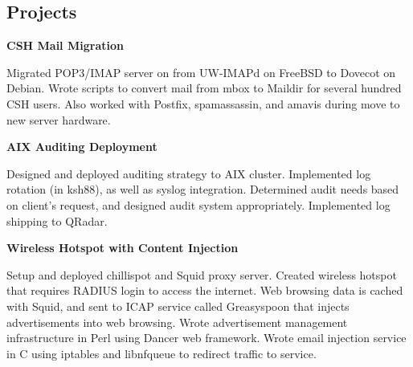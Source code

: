 \documentclass[letter,margin,line]{resume}
\begin{document}
\begin{resume}
\section{\mysidestyle Projects}
	\begin{asparablank}
		\item {\bf CSH Mail Migration}
		
		\small Migrated POP3/IMAP server on from UW-IMAPd on FreeBSD to Dovecot on Debian. Wrote scripts to convert mail from mbox to Maildir for several hundred CSH users. Also worked with Postfix, spamassassin, and amavis during move to new server hardware.
		\normalsize
		\\
		
		\item {\bf AIX Auditing Deployment}
		
		\small Designed and deployed auditing strategy to AIX cluster.
		Implemented log rotation (in ksh88), as well as syslog
		integration. Determined audit needs based on client's request,
		and designed audit system appropriately. Implemented log
		shipping to QRadar.
		\normalsize
		\\
		
		\item {\bf Wireless Hotspot with Content Injection}
		
		\small Setup and deployed chillispot and Squid proxy server.
        Created wireless hotspot that requires RADIUS login to access the
        internet. Web browsing data is cached with Squid, and sent to ICAP
        service called Greasyspoon that injects advertisements into web
        browsing. Wrote advertisement management infrastructure in Perl using
        Dancer web framework. Wrote email injection service in C using iptables
        and libnfqueue to redirect traffic to service.
		\normalsize
		\\
	\end{asparablank}	
\end{resume}
\end{document}
